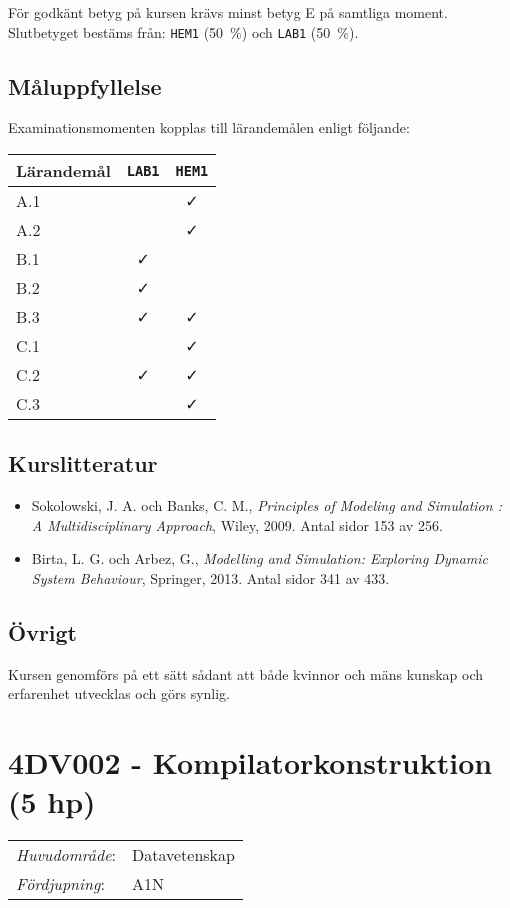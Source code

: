 För godkänt betyg på kursen krävs minst betyg E på samtliga moment.
Slutbetyget bestäms från: \texttt{HEM1} (50~\%) och \texttt{LAB1} (50~\%).

\subsection*{Måluppfyllelse}

Examinationsmomenten kopplas till lärandemålen enligt följande:

\begin{longtable}[]{@{}lcc@{}}
\toprule
\textsf{Lärandemål} & \texttt{LAB1} & \texttt{HEM1}\tabularnewline
\midrule
\endhead
A.1 & & \faCheck\tabularnewline
A.2 & & \faCheck\tabularnewline
B.1 & \faCheck &\tabularnewline
B.2 & \faCheck &\tabularnewline
B.3 & \faCheck & \faCheck\tabularnewline
C.1 & & \faCheck\tabularnewline
C.2 & \faCheck & \faCheck\tabularnewline
C.3 & & \faCheck\tabularnewline
\bottomrule
\end{longtable}

\subsection*{Kurslitteratur}

\begin{itemize}
\tightlist
\item
  Sokolowski, J. A. och Banks, C. M., \emph{Principles of Modeling and
  Simulation : A Multidisciplinary Approach}, Wiley, 2009. Antal sidor
  153 av 256.
\item
  Birta, L. G. och Arbez, G., \emph{Modelling and Simulation: Exploring
  Dynamic System Behaviour}, Springer, 2013. Antal sidor 341 av 433.
\end{itemize}

\subsection*{Övrigt}

Kursen genomförs på ett sätt sådant att både kvinnor och mäns kunskap och erfarenhet utvecklas och görs synlig.
\pagebreak
\section*{4DV002 - Kompilatorkonstruktion (5 hp)}

\begin{tabular}{ll}\emph{Huvudområde}: & Datavetenskap\tabularnewline\emph{Fördjupning}: & A1N\tabularnewline\end{tabular}

